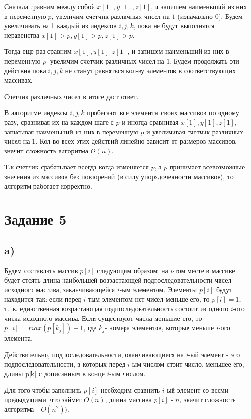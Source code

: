 \documentclass[a4paper,12pt]{article}
\begin{document}
Сначала сравним между собой $x[1], y[1], z[1]$, и запишем наименьший из них в переменную $p$, увеличим счетчик различных чисел на $1$ (изначально $0$). Будем увеличивать на 1 каждый из индексов $i,j,k$, пока не будут выполнятся неравенства $x[1]>p, y[1]>p, z[1]>p$.

Тогда еще раз сравним $x[1], y[1], z[1]$, и запишем наименьший из них в переменную $p$, увеличим счетчик различных чисел на $1$. Будем продолжать эти действия пока $i,j,k$ не станут равняться кол-ву элементов в соответствующих массивах.

Счетчик различных чисел в итоге даст ответ.

В алгоритме индексы $i,j,k$ пробегают все элементы своих массивов по одному разу, сравнивая их на каждом шаге с $p$ и иногда сравнивая $x[1], y[1], z[1]$, записывая наименьший из них в переменную $p$ и увеличивая счетчик различных чисел на $1$. Кол-во всех этих действий линейно зависит от размеров массивов, значит сложность алгоритма $O(n)$.

Т.к счетчик срабатывает всегда когда изменяется $p$, а $p$ принимает всевозможные значения из массивов без повторений (в силу упорядоченности массивов), то алгоритм работает корректно.

\section*{Задание 5}
\subsection*{a)}
\hspace{0.5cm}
Будем составлять массив $p[i]$ следующим образом: на $i$-том месте в массиве будет стоять длина наибольшей возрастающей подпоследовательности чисел исходного массива, заканчивающейся $i$-ым элементом. Элементы $p[i]$ будут находится так: если перед $i$-тым элементом нет чисел меньше его, то $p[i]=1$, т.~к. единственная возрастающая подпоследовательность состоит из одного $i$-ого числа исходного массива. Если существуют числа меньшие его, то $p[i]=max(p[k_{j}])+1$, где $k_{j}$- номера элементов, которые меньше $i$-ого элемента.

Действительно, подпоследовательности, оканчивающиеся на $i$-ый элемент - это подпоследовательности, в которых перед $i$-ым числом стоит число, меньшее его, длины p[k] с дописанным в конце $i$-ым числом.

Для того чтобы заполнить $p[i]$ необходим сравнить $i$-ый элемент со всеми предыдущими, что займет $O(n)$, длина массива $p[i]$ - $n$, значит сложность алгоритма - $O\left( n^2\right) )$.
\end{document}

